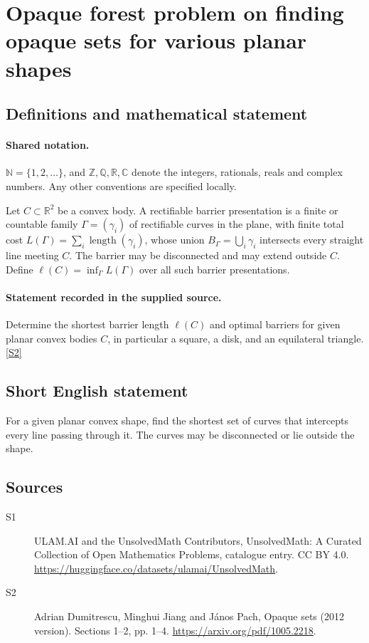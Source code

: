 \documentclass[11pt]{article}
\newcommand{\sref}[2]{\hyperlink{source:#1:#2}{[S#2]}}
\begin{document}
\section{Opaque forest problem on finding opaque sets for various planar shapes}\label{statement}

\subsection{Definitions and mathematical statement}

\paragraph{Shared notation.}$\mathbb N=\{1,2,\ldots\}$, and $\mathbb Z,\mathbb Q,\mathbb R,\mathbb C$ denote the integers, rationals, reals and complex numbers. Any other conventions are specified locally.


Let $C\subset\mathbb R^2$ be a convex body. A rectifiable barrier presentation is a finite or countable family $\Gamma=(\gamma_i)$ of rectifiable curves in the plane, with finite total cost $L(\Gamma)=\sum_i\operatorname{length}(\gamma_i)$, whose union $B_\Gamma=\bigcup_i\gamma_i$ intersects every straight line meeting $C$. The barrier may be disconnected and may extend outside $C$. Define $\ell(C)=\inf_\Gamma L(\Gamma)$ over all such barrier presentations.
\paragraph{Statement recorded in the supplied source.}
Determine the shortest barrier length $\ell(C)$ and optimal barriers for given planar convex bodies $C$, in particular a square, a disk, and an equilateral triangle. \sref{statement}{2}
\subsection{Short English statement}
For a given planar convex shape, find the shortest set of curves that intercepts every line passing through it. The curves may be disconnected or lie outside the shape.
\subsection{Sources}
\begin{description}
\item[\hypertarget{source:statement:1}{S1}] ULAM.AI and the UnsolvedMath Contributors, UnsolvedMath: A Curated Collection of Open Mathematics Problems, catalogue entry. CC BY 4.0. \url{https://huggingface.co/datasets/ulamai/UnsolvedMath}.
\item[\hypertarget{source:statement:2}{S2}] Adrian Dumitrescu, Minghui Jiang and János Pach, Opaque sets (2012 version). Sections 1–2, pp. 1–4. \url{https://arxiv.org/pdf/1005.2218}.
\end{description}
\label{end:statement}
\end{document}
